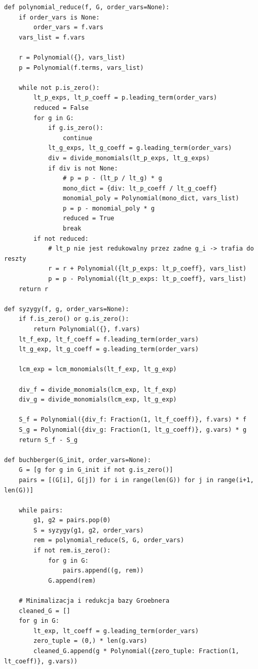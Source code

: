 \documentclass[12pt,a4paper]{article}
\begin{document}
\begin{lstlisting}[caption={Kody źródłowe funkcji algorytmu Buchbergera}]
def polynomial_reduce(f, G, order_vars=None):
    if order_vars is None:
        order_vars = f.vars
    vars_list = f.vars
    
    r = Polynomial({}, vars_list)
    p = Polynomial(f.terms, vars_list)
    
    while not p.is_zero():
        lt_p_exps, lt_p_coeff = p.leading_term(order_vars)
        reduced = False
        for g in G:
            if g.is_zero():
                continue
            lt_g_exps, lt_g_coeff = g.leading_term(order_vars)
            div = divide_monomials(lt_p_exps, lt_g_exps)
            if div is not None:
                # p = p - (lt_p / lt_g) * g
                mono_dict = {div: lt_p_coeff / lt_g_coeff}
                monomial_poly = Polynomial(mono_dict, vars_list)
                p = p - monomial_poly * g
                reduced = True
                break
        if not reduced:
            # lt_p nie jest redukowalny przez zadne g_i -> trafia do reszty
            r = r + Polynomial({lt_p_exps: lt_p_coeff}, vars_list)
            p = p - Polynomial({lt_p_exps: lt_p_coeff}, vars_list)
    return r

def syzygy(f, g, order_vars=None):
    if f.is_zero() or g.is_zero():
        return Polynomial({}, f.vars)
    lt_f_exp, lt_f_coeff = f.leading_term(order_vars)
    lt_g_exp, lt_g_coeff = g.leading_term(order_vars)
    
    lcm_exp = lcm_monomials(lt_f_exp, lt_g_exp)
    
    div_f = divide_monomials(lcm_exp, lt_f_exp)
    div_g = divide_monomials(lcm_exp, lt_g_exp)
    
    S_f = Polynomial({div_f: Fraction(1, lt_f_coeff)}, f.vars) * f
    S_g = Polynomial({div_g: Fraction(1, lt_g_coeff)}, g.vars) * g
    return S_f - S_g

def buchberger(G_init, order_vars=None):
    G = [g for g in G_init if not g.is_zero()]
    pairs = [(G[i], G[j]) for i in range(len(G)) for j in range(i+1, len(G))]
    
    while pairs:
        g1, g2 = pairs.pop(0)
        S = syzygy(g1, g2, order_vars)
        rem = polynomial_reduce(S, G, order_vars)
        if not rem.is_zero():
            for g in G:
                pairs.append((g, rem))
            G.append(rem)
            
    # Minimalizacja i redukcja bazy Groebnera
    cleaned_G = []
    for g in G:
        lt_exp, lt_coeff = g.leading_term(order_vars)
        zero_tuple = (0,) * len(g.vars)
        cleaned_G.append(g * Polynomial({zero_tuple: Fraction(1, lt_coeff)}, g.vars))
        

\end{lstlisting}
\end{document}
